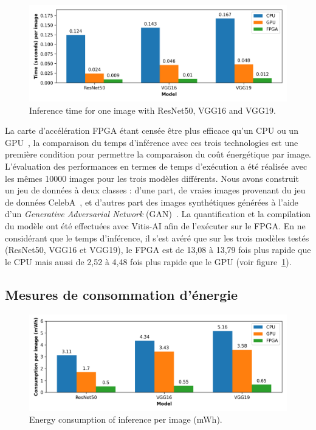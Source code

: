 \begin{figure}[!ht]
    \centering
    \includegraphics[width=\columnwidth]{4_Chapitre4/figures/characterization/time_of_inference_1_image.png}
    \caption{Inference time for one image with ResNet50, VGG16 and VGG19.}
    \label{figure:herofake-time-inference}
\end{figure}

La carte d'accélération FPGA étant censée être plus efficace qu'un CPU ou un GPU~\cite{5272532}, la comparaison du temps d'inférence avec ces trois technologies est une première condition pour permettre la comparaison du coût énergétique par image. L'évaluation des performances en termes de temps d'exécution a été réalisée avec les mêmes 10000 images pour les trois modèles différents. Nous avons construit un jeu de données à deux classes : d'une part, de vraies images provenant du jeu de données CelebA~\cite{https://doi.org/10.48550/arxiv.1411.7766}, et d'autres part des images synthétiques générées à l'aide d'un \textit{Generative Adversarial Network} (GAN)~\cite{jimaging7080128}. La quantification et la compilation du modèle ont été effectuées avec Vitis-AI afin de l'exécuter sur le FPGA. En ne considérant que le temps d'inférence, il s'est avéré que sur les trois modèles testés (ResNet50, VGG16 et VGG19), le FPGA est de 13,08 à 13,79 fois plus rapide que le CPU mais aussi de 2,52 à 4,48 fois plus rapide que le GPU (voir figure~\ref{figure:herofake-time-inference}).

\subsection{Mesures de consommation d'énergie}

\begin{figure}[!ht]
    \centering
    \includegraphics[width=\columnwidth]{4_Chapitre4/figures/characterization/consumption_per_image.png}
    \caption{Energy consumption of inference per image (mWh).}
    \label{figure:herofake-consumption-per-image}
\end{figure}

